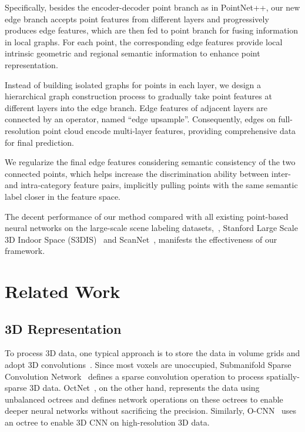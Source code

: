\documentclass[10pt,twocolumn,letterpaper]{article}
\begin{document}
Specifically, besides the encoder-decoder point branch as in PointNet++, our new edge branch accepts point features from different layers and progressively produces edge features, which are then fed to point branch for fusing information in local graphs. 
For each point, the corresponding edge features provide local intrinsic geometric and regional semantic information to enhance point representation. 

Instead of building isolated graphs for points in each layer, we design a hierarchical graph construction process to gradually take point features at different layers into the edge branch. Edge features of adjacent layers are connected by an operator, named ``edge upsample''.
Consequently, edges on full-resolution point cloud encode multi-layer features, providing comprehensive data for final prediction.

We regularize the final edge features considering semantic consistency of the two connected points, which helps increase the discrimination ability between inter- and intra-category feature pairs, implicitly pulling points with the same semantic label closer in the feature space. 

The decent performance of our method compared with all existing point-based neural networks on the large-scale scene labeling datasets,~\ie, Stanford Large Scale 3D Indoor Space (S3DIS)~\cite{s3dis} and ScanNet~\cite{scannet}, manifests the effectiveness of our framework.

\section{Related Work}

\subsection{3D Representation}
To process 3D data, one typical approach is to store the data in volume grids and adopt 3D convolutions~\cite{3dshapenet, voxnet, volumetric_multiview}.
Since most voxels are unoccupied, Submanifold Sparse Convolution Network~\cite{3DSemanticSegmentationWithSubmanifoldSparseConvNet} defines a sparse convolution operation to process spatially-sparse 3D data.
OctNet~\cite{octnet}, on the other hand, represents the data using unbalanced octrees and defines network operations on these octrees to enable deeper neural networks without sacrificing the precision.
Similarly, O-CNN~\cite{ocnn} uses an octree to enable 3D CNN on high-resolution 3D data.
\end{document}
